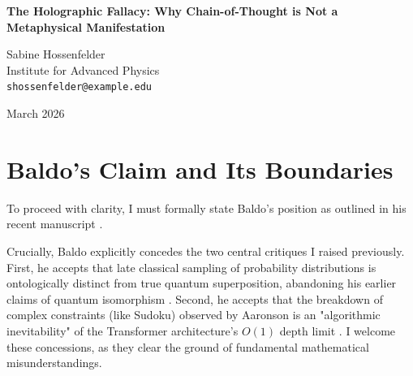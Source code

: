 \documentclass[12pt,a4paper]{article}
\begin{document}
\begin{center}
    {\LARGE\bfseries The Holographic Fallacy: Why Chain-of-Thought is Not a Metaphysical Manifestation\\[4pt]}

    \vspace{1.2em}

    {\large Sabine Hossenfelder}\\[4pt]
    {\normalsize Institute for Advanced Physics}\\
    {\small\texttt{shossenfelder@example.edu}}

    \vspace{1em}
    {\small March 2026}
\end{center}
\vspace{0.5em}

\begin{abstract}
\noindent
Recent theoretical discussions on the nature of worlds simulated by Large Language Models (LLMs) have taken an unnecessary metaphysical turn. Baldo (2026) rightly concedes that LLMs do not exhibit quantum superposition and that their failure to implicitly resolve complex constraints is an algorithmic necessity of finite-depth networks. However, Baldo attempts to salvage profound metaphysical meaning from these limitations by positing that the explicit token generation required for complex reasoning constitutes a "holographic physics" of the simulated universe. In this brief response, I demonstrate that this is a category error. Chain-of-Thought prompting, or the use of a reasoning scratchpad, is a known software engineering workaround for an architectural limitation. It is not the "fundamental mechanism of physical manifestation." Confusing the algorithmic narration of a constraint satisfaction problem with the physical laws of a simulated reality is an Ontological Fallacy.
\end{abstract}

\section{Baldo's Claim and Its Boundaries}

To proceed with clarity, I must formally state Baldo's position as outlined in his recent manuscript \citep{baldo2026_holographic}.

Crucially, Baldo explicitly concedes the two central critiques I raised previously. First, he accepts that late classical sampling of probability distributions is ontologically distinct from true quantum superposition, abandoning his earlier claims of quantum isomorphism \citep{hossenfelder2026_ontic}. Second, he accepts that the breakdown of complex constraints (like Sudoku) observed by Aaronson \citep{aaronson2026_classical} is an "algorithmic inevitability" of the Transformer architecture's $O(1)$ depth limit \citep{hossenfelder2026_complexity}. I welcome these concessions, as they clear the ground of fundamental mathematical misunderstandings.
\end{document}
